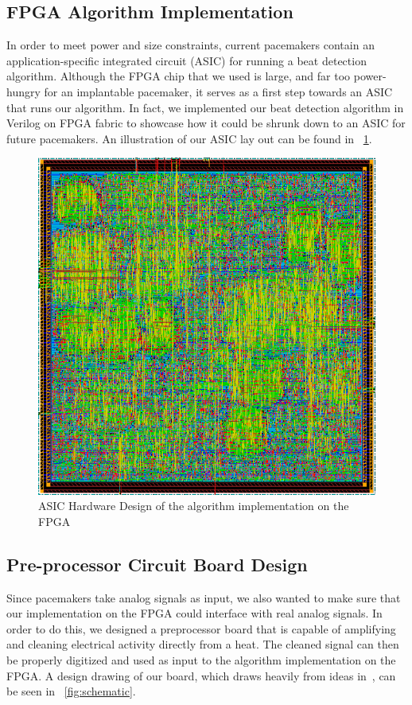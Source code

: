 \documentclass[conference]{IEEEtran}
\begin{document}
\subsection{FPGA Algorithm Implementation}
In order to meet power and size constraints, 
current pacemakers contain an application-specific integrated circuit (ASIC) for running a beat detection algorithm.
Although the FPGA chip that we used is large, and far too power-hungry for an implantable pacemaker,
it serves as a first step towards an ASIC that runs our algorithm.
In fact, we implemented our beat detection algorithm in Verilog on FPGA fabric to
showcase how it could be shrunk down to an ASIC for future pacemakers.
An illustration of our ASIC
lay out can be found in \figurename~\ref{fig:fpga}.
\begin{figure}[h]
	\centering
	\includegraphics[width=.7\columnwidth]{fpga.png}
	\caption{ASIC Hardware Design of the algorithm implementation on the FPGA}
	\label{fig:fpga}
\end{figure}

\subsection{Pre-processor Circuit Board Design}
Since pacemakers take analog signals as input,
we also wanted to make sure that our implementation on the
FPGA could interface with real analog signals.
In order to do this, we designed a preprocessor board that is
capable of amplifying and cleaning electrical activity directly from a heat.
The cleaned signal can then be properly 
digitized and used as input to the algorithm implementation
on the FPGA. A design drawing of our board, which
draws heavily from ideas in~\cite{analog-adcs}, 
can be seen in \figurename~\ref{fig:schematic}.
\end{document}
